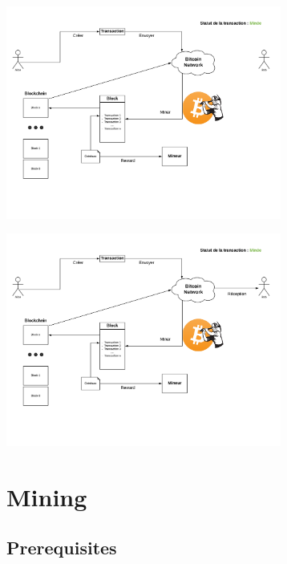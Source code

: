\documentclass{beamer}
\begin{document}
\begin{frame}
    \begin{center}
        \includegraphics[height=7cm]{images/explanation-6.png}
    \end{center}
\end{frame}

\begin{frame}
    \begin{center}
        \includegraphics[height=7cm]{images/explanation-7.png}
    \end{center}
\end{frame}

\section{Mining}
\subsection{Prerequisites}
\end{document}
